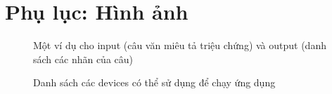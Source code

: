 \section{Phụ lục: Hình ảnh}

\begin{figure}[H]
\centering
{}
\caption{Một ví dụ cho input (câu văn miêu tả triệu chứng) và output (danh sách các nhãn của câu)}
\label{fig:example-result}
\end{figure}

\begin{figure}[H]
\centering
{}
\caption{Danh sách các devices có thể sử dụng để chạy ứng dụng}
\label{fig:flutter-devices}
\end{figure}

